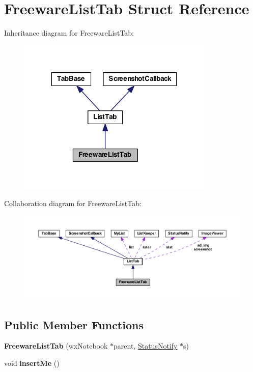 \hypertarget{struct_freeware_list_tab}{\section{Freeware\-List\-Tab Struct Reference}
\label{struct_freeware_list_tab}
}


Inheritance diagram for Freeware\-List\-Tab\-:
\nopagebreak
\begin{figure}[H]
\begin{center}
\leavevmode
\includegraphics[width=264pt]{struct_freeware_list_tab__inherit__graph}
\end{center}
\end{figure}


Collaboration diagram for Freeware\-List\-Tab\-:
\nopagebreak
\begin{figure}[H]
\begin{center}
\leavevmode
\includegraphics[width=350pt]{struct_freeware_list_tab__coll__graph}
\end{center}
\end{figure}
\subsection*{Public Member Functions}
\begin{DoxyCompactItemize}
\item 
\hypertarget{struct_freeware_list_tab_a87d7dda30081d7e72a400a0ab6e77201}{{\bfseries Freeware\-List\-Tab} (wx\-Notebook $\ast$parent, \hyperlink{struct_status_notify}{Status\-Notify} $\ast$s)}\label{struct_freeware_list_tab_a87d7dda30081d7e72a400a0ab6e77201}

\item 
\hypertarget{struct_freeware_list_tab_ac5a683e408ef8d4c4fbef035a004643d}{void {\bfseries insert\-Me} ()}\label{struct_freeware_list_tab_ac5a683e408ef8d4c4fbef035a004643d}

\end{DoxyCompactItemize}



